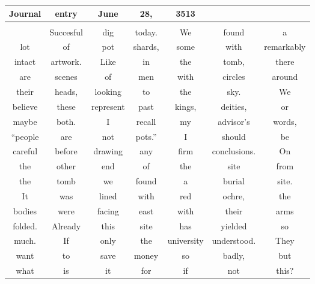 {
  \Large
  \normalfont\wedn
\begin{tabular}{|ccccccc|}
  \hline
  Journal & entry & June & 28, & 3513 & & \\
  \hline
          & & & & & & \\
  \hline
          & Succesful & dig & today. & We & found & a \\
  \hline
  lot & of & pot & shards, & some & with & remarkably \\
  \hline
  intact & artwork. & Like & in & the & tomb, & there \\
  \hline
  are & scenes & of & men & with & circles & around \\
  \hline
  their & heads, & looking & to & the & sky. & We \\
  \hline
  believe & these & represent & past & kings, & deities, & or \\
  \hline
  maybe & both. & I & recall & my & advisor's & words, \\
  \hline
  ``people & are & not & pots.'' & I & should & be \\
  \hline
  careful & before & drawing & any & firm & conclusions. & On \\
  \hline
  the & other & end & of & the & site & from \\
  \hline
  the & tomb & we & found & a & burial & site. \\
  \hline
  It & was & lined & with & red & ochre, & the \\
  \hline
  bodies & were & facing & east & with & their & arms \\
  \hline
  folded. & Already & this & site & has & yielded & so \\
  \hline
  much. & If & only & the & university & understood. & They \\
  \hline
  want & to & save & money & so & badly, & but \\
  \hline
  what & is & it & for & if & not & this? \\
  \hline
\end{tabular}
}
